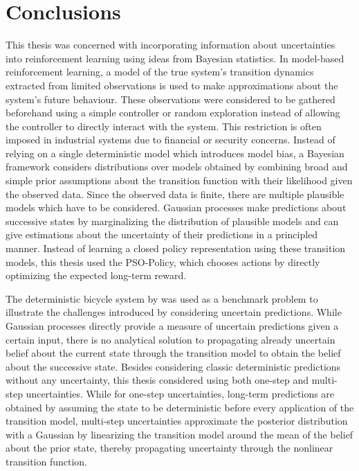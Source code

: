 \chapter{Conclusions}
This thesis was concerned with incorporating information about uncertainties into reinforcement learning using ideas from Bayesian statistics.
In model-based reinforcement learning, a model of the true system's transition dynamics extracted from limited observations is used to make approximations about the system's future behaviour.
These observations were considered to be gathered beforehand using a simple controller or random exploration instead of allowing the controller to directly interact with the system.
This restriction is often imposed in industrial systems due to financial or security concerns.
Instead of relying on a single deterministic model which introduces model bias, a Bayesian framework considers distributions over models obtained by combining broad and simple prior assumptions about the transition function with their likelihood given the observed data.
Since the observed data is finite, there are multiple plausible models which have to be considered.
Gaussian processes make predictions about successive states by marginalizing the distribution of plausible models and can give estimations about the uncertainty of their predictions in a principled manner.
Instead of learning a closed policy representation using these transition models, this thesis used the PSO-Policy, which chooses actions by directly optimizing the expected long-term reward.

The deterministic bicycle system by \citeauthor{randlov_learning_1998} was used as a benchmark problem to illustrate the challenges introduced by considering uncertain predictions.
While Gaussian processes directly provide a measure of uncertain predictions given a certain input, there is no analytical solution to propagating already uncertain belief about the current state through the transition model to obtain the belief about the successive state.
Besides considering classic deterministic predictions without any uncertainty, this thesis considered using both one-step and multi-step uncertainties.
While for one-step uncertainties, long-term predictions are obtained by assuming the state to be deterministic before every application of the transition model, multi-step uncertainties approximate the posterior distribution with a Gaussian by linearizing the transition model around the mean of the belief about the prior state, thereby propagating uncertainty through the nonlinear transition function.

